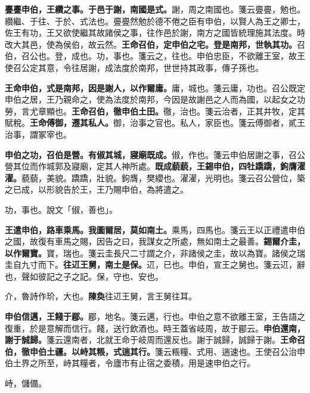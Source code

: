 \textbf{亹亹申伯，王纘之事。于邑于謝，南國是式。}{\footnotesize 謝，周之南國也。箋云亹亹，勉也。纘繼、于往、于於、式法也。亹亹然勉於德不倦之臣有申伯，以賢人為王之卿士，佐王有功，王又欲使繼其故諸侯之事，往作邑於謝，南方之國皆統理施其法度。時改大其邑，使為侯伯，故云然。}\textbf{王命召伯，定申伯之宅。登是南邦，世執其功。}{\footnotesize 召伯，召公也。登，成也。功，事也。箋云之，往也。申伯忠臣，不欲離王室，故王使召公定其意，令往居謝，成法度於南邦，世世持其政事，傳子孫也。}

\textbf{王命申伯，式是南邦，因是謝人，以作爾庸。}{\footnotesize 庸，城也。箋云庸，功也。召公既定申伯之居，王乃親命之，使為法度於南邦，今因是故謝邑之人而為國，以起女之功勞，言尤章顯也。}\textbf{王命召伯，徹申伯土田。}{\footnotesize 徹，治也。箋云治者，正其井牧，定其賦稅。}\textbf{王命傅御，遷其私人。}{\footnotesize 御，治事之官也。私人，家臣也。箋云傅御者，貳王治事，謂冢宰也。}

\textbf{申伯之功，召伯是營。有俶其城，寢廟既成。}{\footnotesize 俶，作也。箋云申伯居謝之事，召公營其位而作城郭及寢廟，定其人神所處。}\textbf{既成藐藐，王錫申伯，四牡蹻蹻，鉤膺濯濯。}{\footnotesize 藐藐，美貌。蹻蹻，壯貌。鉤膺，樊纓也。濯濯，光明也。箋云召公營位，築之已成，以形貌告於王，王乃賜申伯，為將遣之。}

\begin{quoting}功，事也。說文「俶，善也」。\end{quoting}

\textbf{王遣申伯，路車乘馬。我圖爾居，莫如南土。}{\footnotesize 乘馬，四馬也。箋云王以正禮遣申伯之國，故復有車馬之賜，因告之曰，我謀女之所處，無如南土之最善。}\textbf{錫爾介圭，以作爾寶。}{\footnotesize 寶，瑞也。箋云圭長尺二寸謂之介，非諸侯之圭，故以為寶。諸侯之瑞圭自九寸而下。}\textbf{往䢋王舅，南土是保。}{\footnotesize 䢋，已也。申伯，宣王之舅也。箋云䢋，辭也，聲如彼記之子之記。保，守也、安也。}

\begin{quoting}介，魯詩作玠，大也。\textbf{陳奐}往䢋王舅，言王舅往耳。\end{quoting}

\textbf{申伯信邁，王餞于郿。}{\footnotesize 郿，地名。箋云邁，行也。申伯之意不欲離王室，王告語之復重，於是意解而信行。餞，送行飲酒也。時王蓋省岐周，故于郿云。}\textbf{申伯還南，謝于誠歸。}{\footnotesize 箋云還南者，北就王命于岐周而還反也。謝于誠歸，誠歸于謝。}\textbf{王命召伯，徹申伯土疆。以峙其粻，式遄其行。}{\footnotesize 箋云粻糧、式用、遄速也。王使召公治申伯土界之所至，峙其糧者，令廬巿有止宿之委積，用是速申伯之行。}

\begin{quoting}峙，儲備。\end{quoting}

